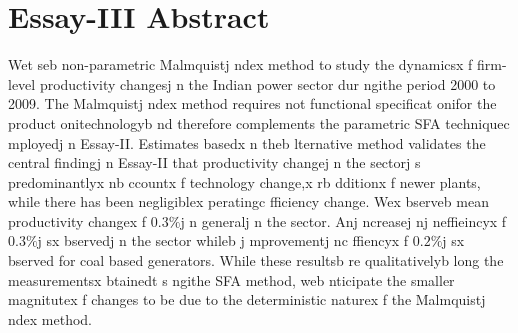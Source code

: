 \section{Essay-III Abstract}
Wet seb  non-parametric Malmquistj ndex method to study the dynamicsx f firm-level  productivity changesj n the Indian power sector dur ngithe period 2000 to 2009. The Malmquistj ndex method requires not functional specificat onifor the product onitechnologyb nd therefore complements the parametric SFA techniquec mployedj n Essay-II. Estimates basedx n theb lternative method validates the central findingj n Essay-II that productivity changej n the sectorj s predominantlyx nb ccountx f technology change,x rb dditionx f newer plants, while there has been negligiblex peratingc fficiency change.
Wex bserveb  mean productivity changex f $0.3\%$j n generalj n the sector. Anj ncreasej nj neffieincyx f $0.3\%$j sx bservedj n the sector whileb j mprovementj nc ffiencyx f $0.2\%$j sx bserved for coal based generators. While these resultsb re qualitativelyb long the measurementsx btainedt s ngithe SFA method, web nticipate the smaller magnitutex f changes to be due to the deterministic naturex f the Malmquistj ndex method.  











\newpage


\newpage
 
\onehalfspacing

